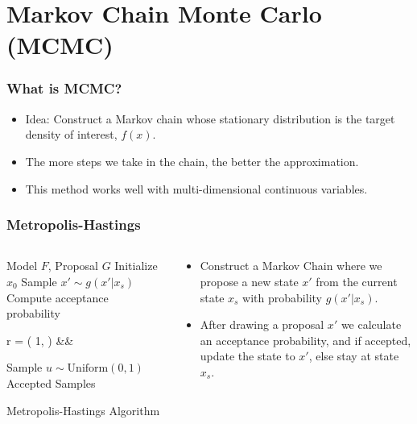 \documentclass{beamer}
\newenvironment{nospaceflalign*}
 {\setlength{\abovedisplayskip}{0pt}\setlength{\belowdisplayskip}{0pt}%
  \csname flalign*\endcsname}
 {\csname endflalign*\endcsname\ignorespacesafterend}
\begin{document}

\section{Markov Chain Monte Carlo (MCMC)}
\begin{frame}
\frametitle{What is MCMC?}
\begin{itemize}
  \item Idea: Construct a Markov chain whose stationary distribution is the
  target density of interest, $f(x)$.
  \item The more steps we take in the chain, the better the approximation.
  \item This method works well with multi-dimensional continuous variables.
\end{itemize}
\end{frame}


\begin{frame}
\frametitle{Metropolis-Hastings}
  \begin{columns}
  \begin{column}{0.5\textwidth}
  \begin{algorithm}[H]
  \scriptsize
  \begin{algorithmic}[1]
    \REQUIRE Model $F$, Proposal $G$
    \STATE Initialize $x_0$
      \STATE Sample $x' \sim g(x'|x_s)$
      \STATE Compute acceptance probability
        \begin{nospaceflalign*}
          r = \min\left( 1, \;   \right) &&
        \end{nospaceflalign*}
      \STATE Sample $u \sim \text{Uniform}(0, 1)$
      \ELSE
      \ENDIF
    \ENDFOR
    \ENSURE Accepted Samples
  \end{algorithmic}
  \caption{Metropolis-Hastings Algorithm}
  \end{algorithm}
  \end{column}
  \begin{column}{0.5\textwidth}
    \begin{itemize}
      \item Construct a Markov Chain where we propose a new state $x'$ from the
      current state $x_s$ with probability $g(x'|x_s)$.
      \item After drawing a proposal $x'$ we calculate an acceptance probability, and
      if accepted, update the state to $x'$, else stay at state $x_s$.
    \end{itemize}
  \end{column}
  \end{columns}
\end{frame}
\end{document}
